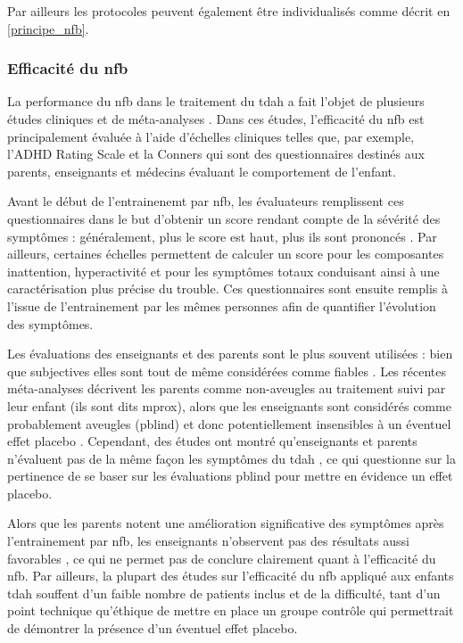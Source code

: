 Par ailleurs les protocoles peuvent également être individualisés comme décrit en \ref{principe_nfb}.

\subsubsection{Efficacité du \gls{nfb}}

La performance du \gls{nfb} dans le traitement du \gls{tdah} a fait l'objet de plusieurs études cliniques \citep{Escolano2014, Maurizio2014, Strehl2017} 
et de méta-analyses \citep{Arns2009, Micoulaud2014, Sonuga-Barke2013, Cortese2016, Catala2017, Lambez2019}. Dans ces études, l'efficacité du \gls{nfb} est 
principalement évaluée à l'aide d'échelles cliniques telles que, par exemple, l'ADHD Rating Scale \citep{Pappas2006} et la Conners \citep{Conners2008} qui sont 
des questionnaires destinés aux parents, enseignants et médecins évaluant le comportement de l'enfant. 

Avant le début de l'entrainenemt par \gls{nfb}, les évaluateurs remplissent ces questionnaires dans le but d'obtenir un score rendant compte de 
la sévérité des symptômes : généralement, plus le score est haut, plus ils sont prononcés \citep{Pappas2006, Conners2008}. Par ailleurs, certaines échelles 
permettent de calculer un score pour les composantes inattention, hyperactivité et pour les symptômes totaux \citep{Pappas2006} conduisant ainsi à une caractérisation 
plus précise du trouble. Ces questionnaires sont ensuite remplis à l'issue de l'entrainement par les mêmes personnes afin de quantifier l'évolution 
des symptômes. 

Les évaluations des enseignants et des parents sont le plus souvent utilisées : bien que subjectives elles sont tout de même considérées comme fiables 
\citep{Mcgough2004}. Les récentes méta-analyses décrivent les parents comme non-aveugles au traitement suivi par leur enfant (ils sont dits \gls{mprox}), alors
que les enseignants sont considérés comme probablement aveugles (\gls{pblind}) et donc potentiellement insensibles à un éventuel effet placebo 
\citep{Micoulaud2014, Cortese2016}. Cependant, des études ont montré qu'enseignants et parents n'évaluent pas de la même façon les symptômes du \gls{tdah}
\citep{Sollie2013, Narad2015, Minder2018}, ce qui questionne sur la pertinence de se baser sur les évaluations \gls{pblind} pour mettre en évidence un 
effet placebo.

Alors que les parents notent une amélioration significative des symptômes après l'entrainement par \gls{nfb}, les enseignants n'observent pas des
résultats aussi favorables \citep{Arns2009, Sonuga-Barke2013, Cortese2016}, ce qui ne permet pas de conclure clairement quant à l'efficacité du \gls{nfb}.
Par ailleurs, la plupart des études sur l'efficacité du \gls{nfb} appliqué aux enfants \gls{tdah} souffent d'un faible nombre de patients inclus 
\citep{Baumeister2016, Heinrich2004} et de la difficulté, tant d'un point technique qu'éthique \citep{LaVaque2001, Birbaumer1991, Holtmann2014} de mettre en place 
un groupe contrôle qui permettrait de démontrer la présence d'un éventuel effet placebo.

